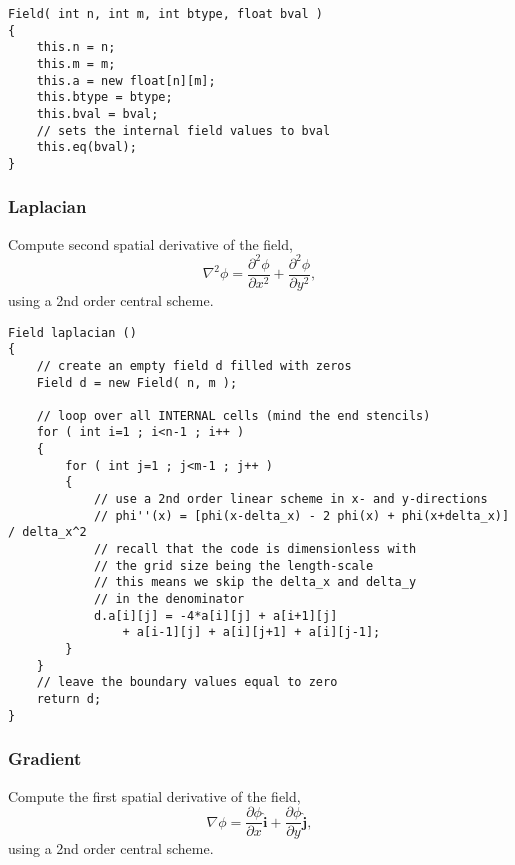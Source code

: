 \documentclass[notitlepage]{article}
\begin{document}
\begin{lstlisting}[style=myCpp]
Field( int n, int m, int btype, float bval )
{
	this.n = n;
	this.m = m;
	this.a = new float[n][m];
	this.btype = btype;
	this.bval = bval;
	// sets the internal field values to bval
	this.eq(bval);
}
\end{lstlisting}

\subsubsection{Laplacian}

Compute second spatial derivative of the field,
%
\begin{equation}
\nabla^2 \phi = \frac{\partial^2\phi}{\partial x^2}
	+ \frac{\partial^2\phi}{\partial y^2},
\end{equation}
%
using a 2nd order central scheme.

\begin{lstlisting}[style=myCpp]
Field laplacian ()
{
	// create an empty field d filled with zeros
	Field d = new Field( n, m );
	
	// loop over all INTERNAL cells (mind the end stencils)
	for ( int i=1 ; i<n-1 ; i++ )
	{
		for ( int j=1 ; j<m-1 ; j++ )
		{
			// use a 2nd order linear scheme in x- and y-directions
			// phi''(x) = [phi(x-delta_x) - 2 phi(x) + phi(x+delta_x)] / delta_x^2
			// recall that the code is dimensionless with
			// the grid size being the length-scale
			// this means we skip the delta_x and delta_y
			// in the denominator
			d.a[i][j] = -4*a[i][j] + a[i+1][j]
				+ a[i-1][j] + a[i][j+1] + a[i][j-1];
		}
	}
	// leave the boundary values equal to zero
	return d;
}
\end{lstlisting}

\subsubsection{Gradient}

Compute the first spatial derivative of the field,
%
\begin{equation}
\nabla \phi = \frac{\partial\phi}{\partial x} \hat{\mathbf{i}}
	+ \frac{\partial\phi}{\partial y} \hat{\mathbf{j}},
\end{equation}
%
using a 2nd order central scheme.
\end{document}
